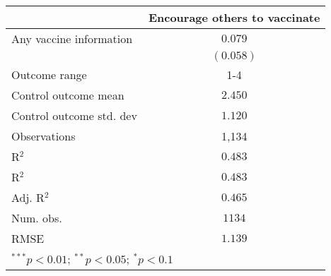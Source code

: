
\begin{table}
\begin{center}
\begin{tabular}{l c}
\hline
 & Encourage others to vaccinate \\
\hline
Any vaccine information  & $0.079$   \\
                         & $(0.058)$ \\
\hline
Outcome range            & 1-4       \\
Control outcome mean     & $2.450$   \\
Control outcome std. dev & $1.120$   \\
Observations             & 1,134     \\
R$^{2}$                  & $0.483$   \\
R$^2$                    & $0.483$   \\
Adj. R$^2$               & $0.465$   \\
Num. obs.                & $1134$    \\
RMSE                     & $1.139$   \\
\hline
\multicolumn{2}{l}{\scriptsize{$^{***}p<0.01$; $^{**}p<0.05$; $^{*}p<0.1$}}
\end{tabular}
\caption{}
\label{table:Tables and Figures/SI_table21_anyinfo_Brazil_encourage1-4}
\end{center}
\end{table}
